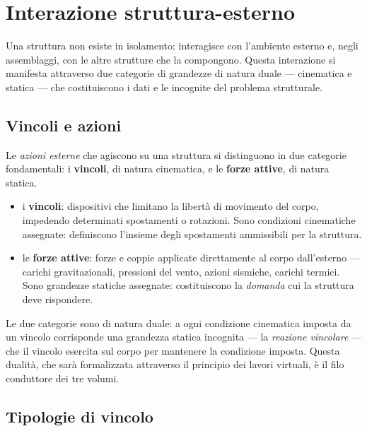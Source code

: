 \section{Interazione struttura-esterno}

Una struttura non esiste in isolamento: interagisce con l'ambiente esterno e, negli assemblaggi, con le altre strutture che la compongono. Questa interazione si manifesta attraverso due categorie di grandezze di natura duale --- cinematica e statica --- che costituiscono i dati e le incognite del problema strutturale.

\subsection{Vincoli e azioni}

Le \textit{azioni esterne} che agiscono su una struttura si distinguono in due categorie fondamentali: i \textbf{vincoli}, di natura cinematica, e le \textbf{forze attive}, di natura statica.

\begin{itemize}[nosep]
	\item i \textbf{vincoli}: dispositivi che limitano	la libertà di movimento del corpo, impedendo	determinati spostamenti o rotazioni. Sono condizioni	cinematiche assegnate: definiscono l'insieme degli	spostamenti ammissibili per la struttura.
	\item le \textbf{forze attive}: forze e coppie	applicate direttamente al corpo dall'esterno ---	carichi gravitazionali, pressioni del vento, azioni	sismiche, carichi termici. Sono grandezze statiche	assegnate: costituiscono la \textit{domanda} cui	la struttura deve rispondere.
	
\end{itemize}

Le due categorie sono di natura duale: a ogni condizione cinematica imposta da un vincolo corrisponde una grandezza statica incognita --- la \textit{reazione 	vincolare} --- che il vincolo esercita sul corpo per mantenere la condizione imposta. Questa dualità, che sarà formalizzata attraverso il principio dei lavori virtuali, è il filo conduttore dei tre volumi.

\subsection{Tipologie di vincolo}

